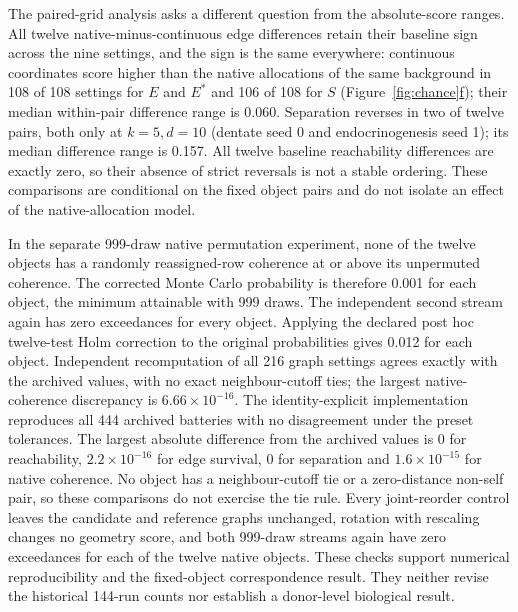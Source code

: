 \documentclass[11pt]{article}
\newcommand{\figpanel}[2]{Figure~\hyperref[#1]{\ref*{#1}#2}}
\begin{document}
The paired-grid analysis asks a different question from the absolute-score ranges. All twelve native-minus-continuous edge differences retain their baseline sign across the nine settings, and the sign is the same everywhere: continuous coordinates score higher than the native allocations of the same background in 108 of 108 settings for $E$ and $E^*$ and 106 of 108 for $S$ (\figpanel{fig:chance}{f}); their median within-pair difference range is 0.060. Separation reverses in two of twelve pairs, both only at $k=5,d=10$ (dentate seed 0 and endocrinogenesis seed 1); its median difference range is 0.157. All twelve baseline reachability differences are exactly zero, so their absence of strict reversals is not a stable ordering. These comparisons are conditional on the fixed object pairs and do not isolate an effect of the native-allocation model.



{ { { { In the separate 999-draw native permutation experiment, none of the twelve objects has a randomly reassigned-row coherence at or above its unpermuted coherence. The corrected Monte Carlo probability is therefore 0.001 for each object, the minimum attainable with 999 draws. The independent second stream again has zero exceedances for every object. Applying the declared post hoc twelve-test Holm correction to the original probabilities gives 0.012 for each object. Independent recomputation of all 216 graph settings agrees exactly with the archived values, with no exact neighbour-cutoff ties; the largest native-coherence discrepancy is $6.66\times10^{-16}$. The identity-explicit implementation reproduces all 444 archived batteries with no disagreement under the preset tolerances. The largest absolute difference from the archived values is 0 for reachability, $2.2\times10^{-16}$ for edge survival, 0 for separation and $1.6\times10^{-15}$ for native coherence. No object has a neighbour-cutoff tie or a zero-distance non-self pair, so these comparisons do not exercise the tie rule. Every joint-reorder control leaves the candidate and reference graphs unchanged, rotation with rescaling changes no geometry score, and both 999-draw streams again have zero exceedances for each of the twelve native objects. These checks support numerical reproducibility and the fixed-object correspondence result. They neither revise the historical 144-run counts nor establish a donor-level biological result.\par}\par}\par}\par}
\end{document}
